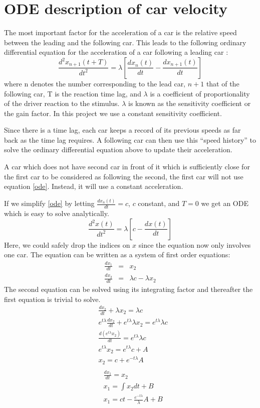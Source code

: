 \documentclass[11pt,a4paper]{article}
\begin{document}
\section{ODE description of car velocity}
The most important factor for the acceleration of a car is the relative speed between the leading and
the following car. This leads to the following ordinary differential equation for the acceleration of a car following a leading car \cite{gazis}:
\begin{equation}
\label{ode}
\frac{d^2 x_{n+1}(t + T)}{dt^2} = \lambda \left[ \frac{dx_n(t)}{dt} - \frac{dx_{n+1}(t)}{dt} \right] 
\end{equation}
where n denotes the number corresponding to the lead car, $n+1$ that of the
following car, T is the reaction time lag, and $\lambda$ is a coefficient of
proportionality of the driver reaction to the stimulus. $\lambda$ is known
as the sensitivity coefficient or the gain factor.
In this project we use a constant sensitivity coefficient.

Since there is a time lag, each car keeps a record of its previous speeds
as far back as the time lag requires. A following car can then use this
``speed history'' to solve the ordinary differential equation above to
update their acceleration.

A car which does not have second car in front of it which is sufficiently
close for the first car to be considered as following the second, the first car will not
use equation \ref{ode}. Instead, it will use a constant acceleration.

If we simplify \ref{ode} by letting $\frac{dx_n(t)}{dt}=c$, $c$ constant, and
$T=0$ we get an ODE which is easy to solve analytically.
$$
\frac{d^2 x(t)}{dt^2} = \lambda \left[ c - \frac{dx(t)}{dt} \right] 
$$
Here, we could safely drop the indices on $x$ since the equation now only
involves one car. The equation can be written as a system of first order
equations:
\begin{eqnarray*}
\frac{dx_1}{dt} &=& x_2 \\
\frac{dx_2}{dt} &=& \lambda c - \lambda x_2
\end{eqnarray*}
The second equation can be solved using its integrating factor and thereafter
the first equation is trivial to solve.
\begin{eqnarray*}
&\frac{dx_2}{dt} + \lambda x_2 = \lambda c \\
&e^{t\lambda}\frac{dx_2}{dt}+e^{t\lambda}\lambda x_2 = e^{t\lambda}\lambda c \\
&\frac{d\left(e^{t\lambda}x_2\right)}{dt} = e^{t\lambda}\lambda c \\
&e^{t\lambda}x_2 = e^{t\lambda}c + A \\
&x_2 = c + e^{-t\lambda}A \\
\end{eqnarray*}
\begin{eqnarray*}
&\frac{dx_1}{dt}=x_2 \\
&x_1 = \int x_2 dt + B \\
&x_1 = ct - \frac{e^{-t\lambda}}{\lambda}A + B
\end{eqnarray*}
\end{document}
